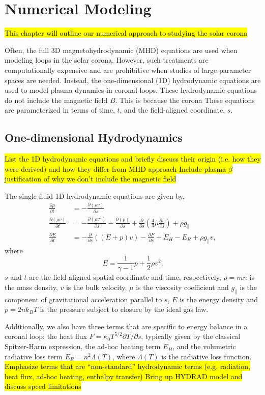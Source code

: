 \chapter{Numerical Modeling}
\label{ch:numerical}
\hl{This chapter will outline our numerical approach to studying the solar corona}
\par Often, the full 3D magnetohydrodynamic (MHD) equations are used when modeling loops in the solar corona. However, such treatments are computationally expensive and are prohibitive when studies of large parameter spaces are needed. Instead, the one-dimensional (1D) hydrodynamic equations are used to model plasma dynamics in coronal loops. These hydrodynamic equations do not include the magnetic field $B$. This is because the corona These equations are parameterized in terms of time, $t$, and the field-aligned coordinate, $s$. 
\section{One-dimensional Hydrodynamics}
\label{sec:1dhydro}
\hl{List the 1D hydrodynamic equations and briefly discuss their origin (i.e. how they were derived) and how they differ from MHD approach
Include plasma $\beta$ justification of why we don't include the magnetic field}
\par The single-fluid 1D hydrodynamic equations are given by,
\begin{align}
	\frac{\partial\rho}{\partial t} &= -\frac{\partial(\rho v)}{\partial s} \label{eq:1dmass} \\
	\frac{\partial(\rho v)}{\partial t} &= -\frac{\partial(\rho v^2)}{\partial s}-\frac{\partial(p)}{\partial s} + \frac{\partial}{\partial s}\left(\frac{4}{3}\mu\frac{\partial v}{\partial s}\right) + \rho g_{\parallel} \label{eq:1dmom} \\
	\frac{\partial E}{\partial t} &= -\frac{\partial}{\partial s}((E+p)v)-\frac{\partial F}{\partial s} + E_H - E_R +\rho g_{\parallel}v, \label{eq:1denergy_sf}
\end{align}
where
\begin{equation}
	E=\frac{1}{\gamma-1}p+\frac{1}{2}\rho v^2.
\end{equation}
$s$ and $t$ are the field-aligned spatial coordinate and time, respectively, $\rho=mn$ is the mass density, $v$ is the bulk velocity, $\mu$ is the viscosity coefficient and $g_{\parallel}$ is the component of gravitational acceleration parallel to $s$, $E$ is the energy density and $p=2nk_BT$ is the pressure subject to closure by the ideal gas law.
\par Additionally, we also have three terms that are specific to energy balance in a coronal loop: the heat flux $F=\kappa_0T^{5/2}\partial T/\partial s$, typically given by the classical Spitzer-Harm expression, the ad-hoc heating term $E_H$, and the volumetric radiative loss term $E_R=n^2\Lambda(T)$, where $\Lambda(T)$ is the radiative loss function.
\hl{Emphasize terms that are ``non-standard'' hydrodynamic terms (e.g. radiation, heat flux, ad-hoc heating, enthalpy transfer)
Bring up HYDRAD model and discuss speed limitations}
